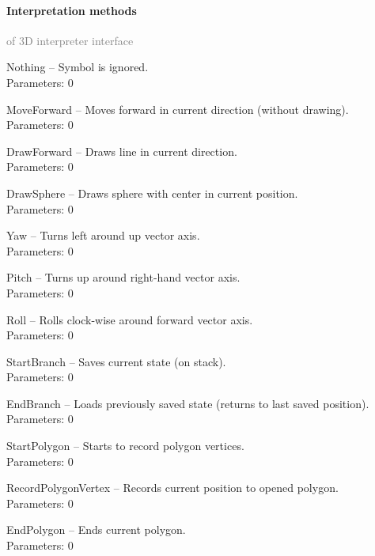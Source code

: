 	\paragraph{Interpretation methods}\textcolor{gray}{of 3D interpreter interface}
	\begin{description*}
		\item[Nothing]
			-- Symbol is ignored.
		\\ Parameters: 0 
		\item[MoveForward]
			-- Moves forward in current direction (without drawing).
		\\ Parameters: 0 
		\item[DrawForward]
			-- Draws line in current direction.
		\\ Parameters: 0 
		\item[DrawSphere]
			-- Draws sphere with center in current position.
		\\ Parameters: 0 
		\item[Yaw]
			-- Turns left around up vector axis.
		\\ Parameters: 0 
		\item[Pitch]
			-- Turns up around right-hand vector axis.
		\\ Parameters: 0 
		\item[Roll]
			-- Rolls clock-wise around forward vector axis.
		\\ Parameters: 0 
		\item[StartBranch]
			-- Saves current state (on stack).
		\\ Parameters: 0 
		\item[EndBranch]
			-- Loads previously saved state (returns to last saved position).
		\\ Parameters: 0 
		\item[StartPolygon]
			-- Starts to record polygon vertices.
		\\ Parameters: 0 
		\item[RecordPolygonVertex]
			-- Records current position to opened polygon.
		\\ Parameters: 0 
		\item[EndPolygon]
			-- Ends current polygon.
		\\ Parameters: 0 
	\end{description*}
	

